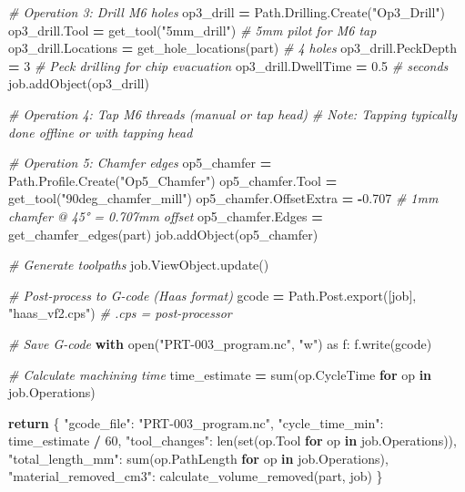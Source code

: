 \documentclass[
]{article}
\newenvironment{Shaded}{\begin{snugshade}}{\end{snugshade}}
\newcommand{\BuiltInTok}[1]{#1}
\newcommand{\CommentTok}[1]{\textcolor[rgb]{0.56,0.35,0.01}{\textit{#1}}}
\newcommand{\ControlFlowTok}[1]{\textcolor[rgb]{0.13,0.29,0.53}{\textbf{#1}}}
\newcommand{\DecValTok}[1]{\textcolor[rgb]{0.00,0.00,0.81}{#1}}
\newcommand{\FloatTok}[1]{\textcolor[rgb]{0.00,0.00,0.81}{#1}}
\newcommand{\ImportTok}[1]{#1}
\newcommand{\KeywordTok}[1]{\textcolor[rgb]{0.13,0.29,0.53}{\textbf{#1}}}
\newcommand{\NormalTok}[1]{#1}
\newcommand{\OperatorTok}[1]{\textcolor[rgb]{0.81,0.36,0.00}{\textbf{#1}}}
\newcommand{\StringTok}[1]{\textcolor[rgb]{0.31,0.60,0.02}{#1}}
\begin{document}
\begin{Shaded}
\begin{Highlighting}[]
    \CommentTok{\# Operation 3: Drill M6 holes}
\NormalTok{    op3\_drill }\OperatorTok{=}\NormalTok{ Path.Drilling.Create(}\StringTok{"Op3\_Drill"}\NormalTok{)}
\NormalTok{    op3\_drill.Tool }\OperatorTok{=}\NormalTok{ get\_tool(}\StringTok{"5mm\_drill"}\NormalTok{)  }\CommentTok{\# 5mm pilot for M6 tap}
\NormalTok{    op3\_drill.Locations }\OperatorTok{=}\NormalTok{ get\_hole\_locations(part)  }\CommentTok{\# 4 holes}
\NormalTok{    op3\_drill.PeckDepth }\OperatorTok{=} \DecValTok{3}  \CommentTok{\# Peck drilling for chip evacuation}
\NormalTok{    op3\_drill.DwellTime }\OperatorTok{=} \FloatTok{0.5}  \CommentTok{\# seconds}
\NormalTok{    job.addObject(op3\_drill)}

    \CommentTok{\# Operation 4: Tap M6 threads (manual or tap head)}
    \CommentTok{\# Note: Tapping typically done offline or with tapping head}

    \CommentTok{\# Operation 5: Chamfer edges}
\NormalTok{    op5\_chamfer }\OperatorTok{=}\NormalTok{ Path.Profile.Create(}\StringTok{"Op5\_Chamfer"}\NormalTok{)}
\NormalTok{    op5\_chamfer.Tool }\OperatorTok{=}\NormalTok{ get\_tool(}\StringTok{"90deg\_chamfer\_mill"}\NormalTok{)}
\NormalTok{    op5\_chamfer.OffsetExtra }\OperatorTok{=} \OperatorTok{{-}}\FloatTok{0.707}  \CommentTok{\# 1mm chamfer @ 45° = 0.707mm offset}
\NormalTok{    op5\_chamfer.Edges }\OperatorTok{=}\NormalTok{ get\_chamfer\_edges(part)}
\NormalTok{    job.addObject(op5\_chamfer)}

    \CommentTok{\# Generate toolpaths}
\NormalTok{    job.ViewObject.update()}

    \CommentTok{\# Post{-}process to G{-}code (Haas format)}
\NormalTok{    gcode }\OperatorTok{=}\NormalTok{ Path.Post.export([job], }\StringTok{"haas\_vf2.cps"}\NormalTok{)  }\CommentTok{\# .cps = post{-}processor}

    \CommentTok{\# Save G{-}code}
    \ControlFlowTok{with} \BuiltInTok{open}\NormalTok{(}\StringTok{"PRT{-}003\_program.nc"}\NormalTok{, }\StringTok{"w"}\NormalTok{) }\ImportTok{as}\NormalTok{ f:}
\NormalTok{        f.write(gcode)}

    \CommentTok{\# Calculate machining time}
\NormalTok{    time\_estimate }\OperatorTok{=} \BuiltInTok{sum}\NormalTok{(op.CycleTime }\ControlFlowTok{for}\NormalTok{ op }\KeywordTok{in}\NormalTok{ job.Operations)}

    \ControlFlowTok{return}\NormalTok{ \{}
        \StringTok{"gcode\_file"}\NormalTok{: }\StringTok{"PRT{-}003\_program.nc"}\NormalTok{,}
        \StringTok{"cycle\_time\_min"}\NormalTok{: time\_estimate }\OperatorTok{/} \DecValTok{60}\NormalTok{,}
        \StringTok{"tool\_changes"}\NormalTok{: }\BuiltInTok{len}\NormalTok{(}\BuiltInTok{set}\NormalTok{(op.Tool }\ControlFlowTok{for}\NormalTok{ op }\KeywordTok{in}\NormalTok{ job.Operations)),}
        \StringTok{"total\_length\_mm"}\NormalTok{: }\BuiltInTok{sum}\NormalTok{(op.PathLength }\ControlFlowTok{for}\NormalTok{ op }\KeywordTok{in}\NormalTok{ job.Operations),}
        \StringTok{"material\_removed\_cm3"}\NormalTok{: calculate\_volume\_removed(part, job)}
\NormalTok{    \}}


\end{Highlighting}
\end{Shaded}
\end{document}
